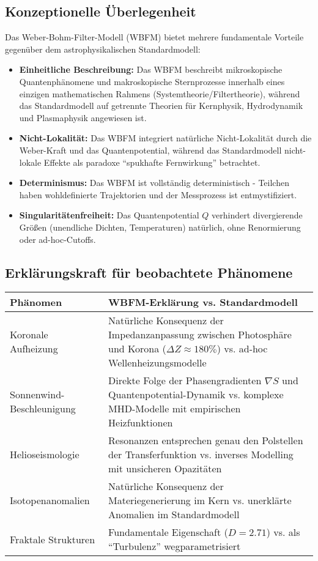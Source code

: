 \subsection{Konzeptionelle Überlegenheit}

Das Weber-Bohm-Filter-Modell (WBFM) bietet mehrere fundamentale Vorteile gegenüber dem astrophysikalischen Standardmodell:

\begin{itemize}
\item \textbf{Einheitliche Beschreibung:} Das WBFM beschreibt mikroskopische Quantenphänomene und makroskopische Sternprozesse innerhalb eines einzigen mathematischen Rahmens (Systemtheorie/Filtertheorie), während das Standardmodell auf getrennte Theorien für Kernphysik, Hydrodynamik und Plasmaphysik angewiesen ist.
\item \textbf{Nicht-Lokalität:} Das WBFM integriert natürliche Nicht-Lokalität durch die Weber-Kraft und das Quantenpotential, während das Standardmodell nicht-lokale Effekte als paradoxe \enquote{spukhafte Fernwirkung} betrachtet.
\item \textbf{Determinismus:} Das WBFM ist vollständig deterministisch - Teilchen haben wohldefinierte Trajektorien und der Messprozess ist entmystifiziert.
\item \textbf{Singularitätenfreiheit:} Das Quantenpotential $Q$ verhindert divergierende Größen (unendliche Dichten, Temperaturen) natürlich, ohne Renormierung oder ad-hoc-Cutoffs.
\end{itemize}

\subsection{Erklärungskraft für beobachtete Phänomene}

\begin{tabular}{p{}p{}}
\hline
\textbf{Phänomen} & \textbf{WBFM-Erklärung vs. Standardmodell} \\
\hline
Koronale Aufheizung & Natürliche Konsequenz der Impedanzanpassung zwischen Photosphäre und Korona ($\Delta Z \approx 180\%$) vs. ad-hoc Wellenheizungsmodelle \\
\hline
Sonnenwind-Beschleunigung & Direkte Folge der Phasengradienten $\nabla S$ und Quantenpotential-Dynamik vs. komplexe MHD-Modelle mit empirischen Heizfunktionen \\
\hline
Helioseismologie & Resonanzen entsprechen genau den Polstellen der Transferfunktion vs. inverses Modelling mit unsicheren Opazitäten \\
\hline
Isotopenanomalien & Natürliche Konsequenz der Materiegenerierung im Kern vs. unerklärte Anomalien im Standardmodell \\
\hline
Fraktale Strukturen & Fundamentale Eigenschaft ($D = 2.71$) vs. als \enquote{Turbulenz} wegparametrisiert \\
\hline
\end{tabular}

